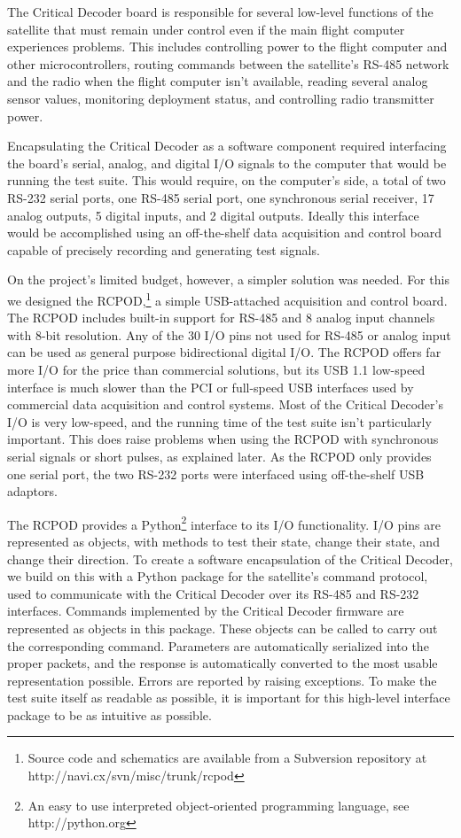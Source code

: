 \documentclass[letterpaper,twocolumn]{article}
\begin{document}
The Critical Decoder board is responsible for several low-level functions of the satellite that must
remain under control even if the main flight computer experiences problems. This includes controlling
power to the flight computer and other microcontrollers, routing commands between the satellite's RS-485
network and the radio when the flight computer isn't available, reading several analog sensor values,
monitoring deployment status, and controlling radio transmitter power.

Encapsulating the Critical Decoder as a software component required interfacing the board's serial, analog,
and digital I/O signals to the computer that would be running the test suite. This would require, on the
computer's side, a total of two RS-232 serial ports, one RS-485 serial port, one synchronous serial receiver,
17 analog outputs, 5 digital inputs, and 2 digital outputs. Ideally this interface would be accomplished
using an off-the-shelf data acquisition and control board capable of precisely recording and generating
test signals.

On the project's limited budget, however, a simpler solution was needed. For this we designed the
RCPOD,\footnote{Source code and schematics are available from a Subversion repository at http://navi.cx/svn/misc/trunk/rcpod}
a simple USB-attached acquisition and control board. The RCPOD includes built-in support for RS-485
and 8 analog input channels with 8-bit resolution. Any of the 30 I/O pins not used for RS-485 or analog
input can be used as general purpose bidirectional digital I/O. The RCPOD offers far more I/O for the price
than commercial solutions, but its USB 1.1 low-speed interface is much slower than the PCI or full-speed USB
interfaces used by commercial data acquisition and control systems. Most of the Critical Decoder's I/O is
very low-speed, and the running time of the test suite isn't particularly important. This does raise problems
when using the RCPOD with synchronous serial signals or short pulses, as explained later. As the RCPOD only
provides one serial port, the two RS-232 ports were interfaced using off-the-shelf USB adaptors.

The RCPOD provides a Python\footnote{An easy to use interpreted object-oriented programming language, see http://python.org}
interface to its I/O functionality. I/O pins are represented as objects, with methods to test their state, change
their state, and change their direction. To create a software encapsulation of the Critical Decoder, we build on this
with a Python package for the satellite's command protocol, used to communicate with the Critical Decoder over
its RS-485 and RS-232 interfaces. Commands implemented by the Critical Decoder firmware
are represented as objects in this package. These objects can be called to carry out the corresponding command.
Parameters are automatically serialized into the proper packets, and the response is automatically
converted to the most usable representation possible. Errors are reported by raising exceptions. To
make the test suite itself as readable as possible, it is important for this high-level interface package to be
as intuitive as possible.
\end{document}
